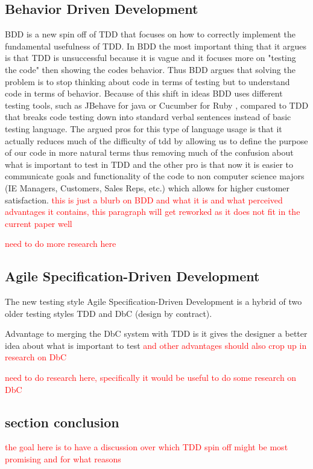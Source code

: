 \documentclass{sig-alternate}
\newcommand{\mycomment}[1]{\textcolor{red}{#1}}
\begin{document}
\subsection{Behavior Driven Development}
BDD is a new spin off of TDD that focuses on how to correctly implement the fundamental usefulness of TDD.  In BDD the most important thing that it argues is that TDD is unsuccessful because it is vague and it focuses more on "testing the code" then showing the codes behavior.  Thus BDD argues that solving the problem is to stop thinking about code in terms of testing but to understand code in terms of behavior.  Because of this shift in ideas BDD uses different testing tools, such as JBehave for java or Cucumber for Ruby \cite{Soeken:2012}, compared to TDD that breaks code testing down into standard verbal sentences instead of basic testing language.  The argued pros for this type of language usage is that it actually reduces much of the difficulty of tdd by allowing us to define the purpose of our code in more natural terms thus removing much of the confusion about what is important to test in TDD and the other pro is that now it is easier to communicate goals and functionality of the code to non computer science majors (IE Managers, Customers, Sales Reps, etc.) which allows for higher customer satisfaction.
\mycomment{this is just a blurb on BDD and what it is and what perceived advantages it contains, this paragraph will get reworked as it does not fit in the current paper well}

\mycomment{need to do more research here}

\subsection{Agile Specification-Driven Development}
The new testing style Agile Specification-Driven Development is a hybrid of two older testing styles TDD and DbC (design by contract).

Advantage to merging the DbC system with TDD is it gives the designer a better idea about what is important to test \mycomment{and other advantages should also crop up in research on DbC}

\mycomment{need to do research here, specifically it would be useful to do some research on DbC}

\subsection{section conclusion}
\mycomment{the goal here is to have a discussion over which TDD spin off might be most promising and for what reasons}
\end{document}
